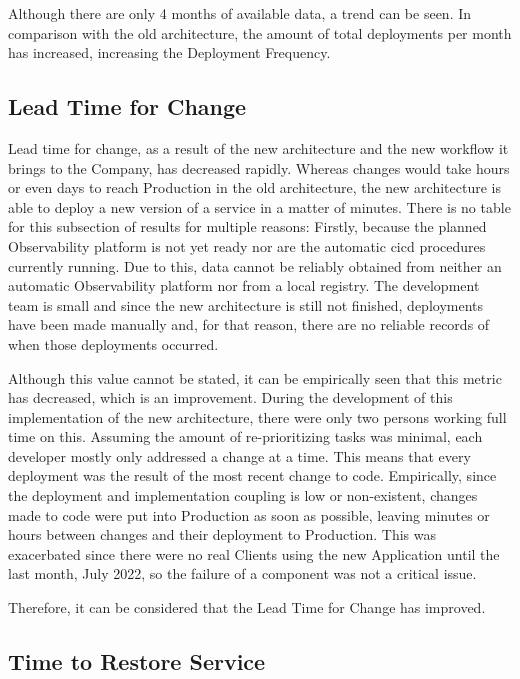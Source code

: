 Although there are only 4 months of available data, a trend can be seen. In comparison with the old architecture, the amount of total deployments per month has increased, increasing the Deployment Frequency.

\subsection{Lead Time for Change}\label{results-and-discussion:ss:lead-time-for-change}

Lead time for change, as a result of the new architecture and the new workflow it brings to the Company, has decreased rapidly. Whereas changes would take hours or even days to reach Production in the old architecture, the new architecture is able to deploy a new version of a service in a matter of minutes. There is no table for this subsection of results for multiple reasons:
Firstly, because the planned Observability platform is not yet ready nor are the automatic \gls{cicd} procedures currently running. Due to this, data cannot be reliably obtained from neither an automatic Observability platform nor from a local registry. The development team is small and since the new architecture is still not finished, deployments have been made manually and, for that reason, there are no reliable records of when those deployments occurred. 

Although this value cannot be stated, it can be empirically seen that this metric has decreased, which is an improvement. During the development of this implementation of the new architecture, there were only two persons working full time on this. Assuming the amount of re-prioritizing tasks was minimal, each developer mostly only addressed a change at a time. This means that every deployment was the result of the most recent change to code. Empirically, since the deployment and implementation coupling is low or non-existent, changes made to code were put into Production as soon as possible, leaving minutes or hours between changes and their deployment to Production. This was exacerbated since there were no real Clients using the new Application until the last month, July 2022, so the failure of a component was not a critical issue.

Therefore, it can be considered that the Lead Time for Change has improved.

\subsection{Time to Restore Service}\label{results-and-discussion:ss:Time to Restore Service}

